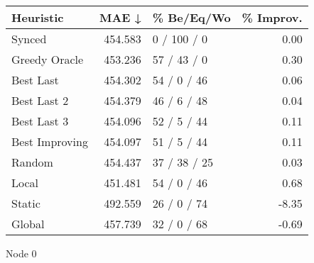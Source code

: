 \begin{tabular}{lrlr}
\toprule
\textbf{Heuristic} & \textbf{MAE ↓} & \textbf{\% Be/Eq/Wo} & \textbf{\% Improv.} \\
\midrule
            Synced &        454.583 &          0 / 100 / 0 &                0.00 \\
     Greedy Oracle &        453.236 &          57 / 43 / 0 &                0.30 \\
         Best Last &        454.302 &          54 / 0 / 46 &                0.06 \\
       Best Last 2 &        454.379 &          46 / 6 / 48 &                0.04 \\
       Best Last 3 &        454.096 &          52 / 5 / 44 &                0.11 \\
    Best Improving &        454.097 &          51 / 5 / 44 &                0.11 \\
            Random &        454.437 &         37 / 38 / 25 &                0.03 \\
             Local &        451.481 &          54 / 0 / 46 &                0.68 \\
            Static &        492.559 &          26 / 0 / 74 &               -8.35 \\
            Global &        457.739 &          32 / 0 / 68 &               -0.69 \\
\bottomrule
\end{tabular}
\caption{Node 0}
\label{tab:non_lr01_le2_bs4_0}
